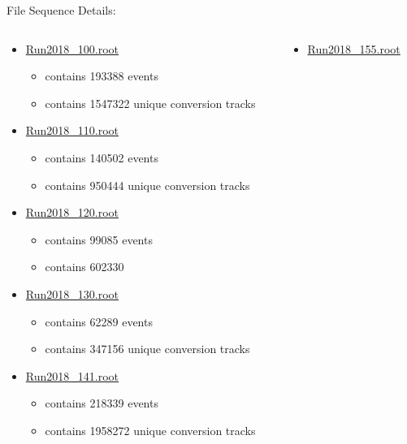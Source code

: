 \documentclass[10pt]{beamer}
\begin{document}
\begin{frame}
File Sequence Details:\\
\begin{columns}
	\begin{column}{0.5\textwidth}
\scriptsize
\begin{itemize}
    \item \url{Run2018_100.root} 
         \begin{itemize}
         	\scriptsize
      		\item   contains 193388 events
       		\item  contains 1547322 unique conversion tracks
        \end{itemize}
   \item \url{Run2018_110.root}
        \begin{itemize}
        \scriptsize
     		 \item   contains 140502 events
     		\item   contains 950444 unique conversion tracks
        \end{itemize}
   \item \url{Run2018_120.root}
        \begin{itemize}
        \scriptsize
      		 \item  contains 99085 events
      		 \item  contains 602330
        \end{itemize}
    \item \url{Run2018_130.root} 
        \begin{itemize}
        \scriptsize
       		\item  contains 62289 events
       		\item  contains 347156 unique conversion tracks
        \end{itemize}
   \item \url{Run2018_141.root}
        \begin{itemize}
        \scriptsize
      		\item  contains 218339 events
       		\item  contains 1958272 unique conversion tracks
        \end{itemize}
        \end{itemize}
        \end{column}
        \begin{column}{0.5\textwidth}
	\scriptsize
		\begin{itemize}
   \item \url{Run2018_155.root}

\end{itemize}
\end{column}
\end{columns}
\end{frame}
\end{document}
